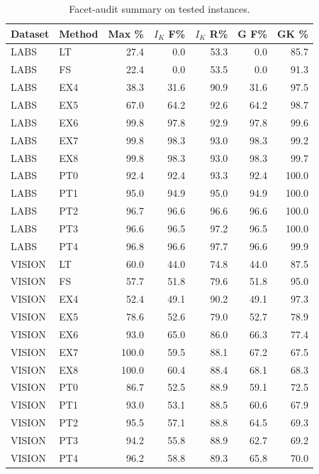 \begin{table}[b]
\centering
\caption{Facet-audit summary on tested instances. }
\label{tab:facet-audit-root-summary}
\begin{tabular}{llrrrrr}
\toprule
Dataset & Method & Max \% & $I_K$ F\% & $I_K$ R\% & G F\% & GK \% \\
\midrule
LABS & LT & 27.4 & 0.0 & 53.3 & 0.0 & 85.7 \\
LABS & FS & 22.4 & 0.0 & 53.5 & 0.0 & 91.3 \\
LABS & EX4 & 38.3 & 31.6 & 90.9 & 31.6 & 97.5 \\
LABS & EX5 & 67.0 & 64.2 & 92.6 & 64.2 & 98.7 \\
LABS & EX6 & 99.8 & 97.8 & 92.9 & 97.8 & 99.6 \\
LABS & EX7 & 99.8 & 98.3 & 93.0 & 98.3 & 99.2 \\
LABS & EX8 & 99.8 & 98.3 & 93.0 & 98.3 & 99.7 \\
LABS & PT0 & 92.4 & 92.4 & 93.3 & 92.4 & 100.0 \\
LABS & PT1 & 95.0 & 94.9 & 95.0 & 94.9 & 100.0 \\
LABS & PT2 & 96.7 & 96.6 & 96.6 & 96.6 & 100.0 \\
LABS & PT3 & 96.6 & 96.5 & 97.2 & 96.5 & 100.0 \\
LABS & PT4 & 96.8 & 96.6 & 97.7 & 96.6 & 99.9 \\
\addlinespace
VISION & LT & 60.0 & 44.0 & 74.8 & 44.0 & 87.5 \\
VISION & FS & 57.7 & 51.8 & 79.6 & 51.8 & 95.0 \\
VISION & EX4 & 52.4 & 49.1 & 90.2 & 49.1 & 97.3 \\
VISION & EX5 & 78.6 & 52.6 & 79.0 & 52.7 & 78.9 \\
VISION & EX6 & 93.0 & 65.0 & 86.0 & 66.3 & 77.4 \\
VISION & EX7 & 100.0 & 59.5 & 88.1 & 67.2 & 67.5 \\
VISION & EX8 & 100.0 & 60.4 & 88.4 & 68.1 & 68.3 \\
VISION & PT0 & 86.7 & 52.5 & 88.9 & 59.1 & 72.5 \\
VISION & PT1 & 93.0 & 53.1 & 88.5 & 60.6 & 67.9 \\
VISION & PT2 & 95.5 & 57.1 & 88.8 & 64.5 & 69.3 \\
VISION & PT3 & 94.2 & 55.8 & 88.9 & 62.7 & 69.2 \\
VISION & PT4 & 96.2 & 58.8 & 89.3 & 65.8 & 70.0 \\
\bottomrule
\end{tabular}
\end{table}
